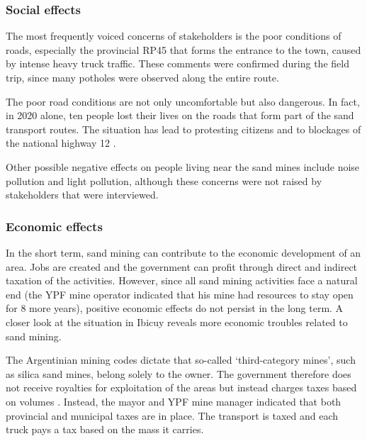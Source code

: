 \subsubsection{Social effects}
The most frequently voiced concerns of stakeholders is the poor conditions of roads, especially the provincial RP45 that forms the entrance to the town, caused by intense heavy truck traffic. These comments were confirmed during the field trip, since many potholes were observed along the entire route.

The poor road conditions are not only uncomfortable but also dangerous. In fact, in 2020 alone, ten people lost their lives on the roads that form part of the sand transport routes. The situation has lead to protesting citizens and to blockages of the national highway 12 \autocite{novasImpactoAmbientalOculto2022}.

Other possible negative effects on people living near the sand mines include noise pollution and light pollution, although these concerns were not raised by stakeholders that were interviewed.

\subsubsection{Economic effects}
In the short term, sand mining can contribute to the economic development of an area. Jobs are created and the government can profit through direct and indirect taxation of the activities. However, since all sand mining activities face a natural end (the YPF mine operator indicated that his mine had resources to stay open for 8 more years), positive economic effects do not persist in the long term. A closer look at the situation in Ibicuy reveals more economic troubles related to sand mining.

The Argentinian mining codes dictate that so-called `third-category mines', such as silica sand mines, belong solely to the owner. The government therefore does not receive royalties for exploitation of the areas but instead charges taxes based on volumes \autocite{novasImpactoAmbientalOculto2022}. Instead, the mayor and YPF mine manager indicated that both provincial and municipal taxes are in place. The transport is taxed and each truck pays a tax based on the mass it carries.

